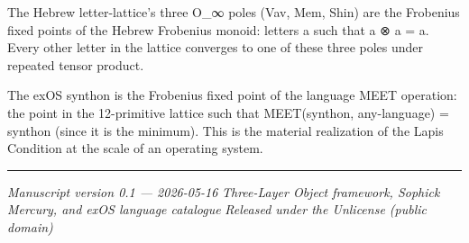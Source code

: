 \documentclass[
  11pt,
  a4paper,
]{article}
\begin{document}
The Hebrew letter-lattice's three O\_∞ poles (Vav, Mem, Shin) are the
Frobenius fixed points of the Hebrew Frobenius monoid: letters a such
that a ⊗ a = a. Every other letter in the lattice converges to one of
these three poles under repeated tensor product.

The exOS synthon is the Frobenius fixed point of the language MEET
operation: the point in the 12-primitive lattice such that MEET(synthon,
any-language) = synthon (since it is the minimum). This is the material
realization of the Lapis Condition at the scale of an operating system.

\begin{center}\rule{0.5\linewidth}{0.5pt}\end{center}

\emph{Manuscript version 0.1 --- 2026-05-16} \emph{Three-Layer Object
framework, Sophick Mercury, and exOS language catalogue} \emph{Released
under the Unlicense (public domain)}
\end{document}
